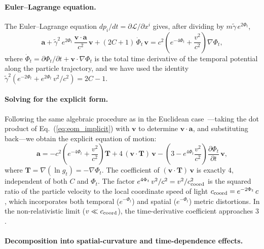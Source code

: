 \documentclass[12pt]{article}
\begin{document}
\paragraph{Euler--Lagrange equation.}

The Euler--Lagrange equation $d p_i/dt = \partial\mathcal{L}/\partial x^i$ gives, after dividing by $m\tilde{\gamma}\,e^{2\Phi_t}$,
\begin{equation}
\mathbf{a} + \tilde{\gamma}^2\,e^{2\Phi_t}\,\frac{\mathbf{v}\cdot\mathbf{a}}{c^2}\,\mathbf{v}
+ (2C + 1)\,\dot{\Phi}_t\,\mathbf{v}
= c^2\left(e^{-4\Phi_t} + \frac{v^2}{c^2}\right)\nabla\Phi_t,
\label{eq:eom_implicit}
\end{equation}
where $\dot{\Phi}_t = \partial\Phi_t/\partial t + \mathbf{v}\cdot\nabla\Phi_t$ is the total time derivative of the temporal potential along the particle trajectory, and we have used the identity $\tilde{\gamma}^2(e^{-2\Phi_t} + e^{2\Phi_t}\,v^2/c^2) = 2C - 1$.

\paragraph{Solving for the explicit form.}

Following the same algebraic procedure as in the Euclidean case~\cite{Gwak2026a}---taking the dot product of Eq.~(\ref{eq:eom_implicit}) with $\mathbf{v}$ to determine $\mathbf{v}\cdot\mathbf{a}$, and substituting back---we obtain the explicit equation of motion:
\begin{equation}
\boxed{\mathbf{a} = -c^2\!\left(e^{-4\Phi_t} + \frac{v^2}{c^2}\right)\mathbf{T}
+ 4\,(\mathbf{v}\cdot\mathbf{T})\,\mathbf{v}
- \left(3 - e^{4\Phi_t}\frac{v^2}{c^2}\right)\frac{\partial\Phi_t}{\partial t}\,\mathbf{v},}
\label{eq:eom_dynamic}
\end{equation}
where $\mathbf{T} = \nabla(\ln g_t) = -\nabla\Phi_t$. The coefficient of $(\mathbf{v}\cdot\mathbf{T})\,\mathbf{v}$ is exactly $4$, independent of both $C$ and $\Phi_t$. The factor $e^{4\Phi_t}\,v^2/c^2 = v^2/c_{\rm coord}^2$ is the squared ratio of the particle velocity to the local coordinate speed of light $c_{\rm coord} = e^{-2\Phi_t}\,c$, which incorporates both temporal ($e^{-\Phi_t}$) and spatial ($e^{-\Phi_t}$) metric distortions. In the non-relativistic limit ($v \ll c_{\rm coord}$), the time-derivative coefficient approaches $3$.

\paragraph{Decomposition into spatial-curvature and time-dependence effects.}
\end{document}
